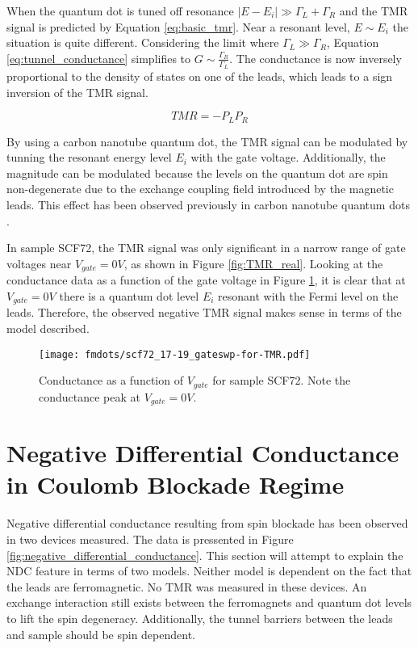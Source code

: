 When the quantum dot is tuned off resonance $|E-E_i| \gg \Gamma_L + \Gamma_R$ and the TMR signal is predicted by Equation \ref{eq:basic_tmr}. Near a resonant level, $E \sim E_i$ the situation is quite different. Considering the limit where $\Gamma_L \gg \Gamma_R$, Equation \ref{eq:tunnel_conductance} simplifies to $G \sim \frac{\Gamma_R}{\Gamma_L}$. The conductance is now inversely proportional to the density of states on one of the leads, which leads to a sign inversion of the TMR signal.

\begin{equation}
\label{eq:sign_inversion}
    TMR = -P_L P_R
\end{equation}

By using a carbon nanotube quantum dot, the TMR signal can be modulated by tunning the resonant energy level $E_i$ with the gate voltage. Additionally, the magnitude can be modulated because the levels on the quantum dot are spin non-degenerate due to the exchange coupling field introduced by the magnetic leads. This effect has been observed previously in carbon nanotube quantum dots \cite{Sahoo2005, Thamankar2006}. 

In sample SCF72, the TMR signal was only significant in a narrow range of gate voltages near $V_{gate}=0V$, as shown in Figure \ref{fig:TMR_real}. Looking at the conductance data as a function of the gate voltage in Figure \ref{fig:TMR_gate}, it is clear that at $V_{gate}=0V$ there is a quantum dot level $E_i$ resonant with the Fermi level on the leads. Therefore, the observed negative TMR signal makes sense in terms of the model described.

\begin{figure}
    \centering
    \texttt{[image: fmdots/scf72\_17-19\_gateswp-for-TMR.pdf]}
    \caption{Conductance as a function of $V_{gate}$ for sample SCF72. Note the conductance peak at $V_{gate}=0V$.}
    \label{fig:TMR_gate}
\end{figure}

\section{Negative Differential Conductance in Coulomb Blockade Regime}

Negative differential conductance resulting from spin blockade has been observed in two devices measured. The data is pressented in Figure \ref{fig:negative_differential_conductance}. This section will attempt to explain the NDC feature in terms of two models. Neither model is dependent on the fact that the leads are ferromagnetic. No TMR was measured in these devices. An exchange interaction still exists between the ferromagnets and quantum dot levels to lift the spin degeneracy. Additionally, the tunnel barriers between the leads and sample should be spin dependent.

